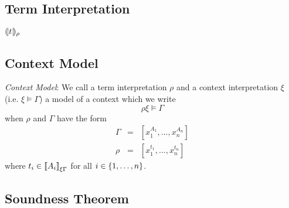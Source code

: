 \subsection{Term Interpretation}

${(\!|t|\!)_{\rho}}$



\subsection{Context Model}

\begin{definition}
    \label{DefinitionContextModel}
    \emph{Context Model}: We call a term interpretation $\rho$ and a context
    interpretation $\xi$ (i.e. $\xi \vDash \Gamma$) a model of a context which
    we write
    $$
        \rho\xi \vDash \Gamma
    $$
    when
    $\rho$ and $\Gamma$ have the form
    $$
    \begin{array}{lll}
        \Gamma &=& [x_1^{A_1}, \ldots, x_n^{A_n}]
        \\
        \rho   &=& [x_1^{t_1}, \ldots, x_n^{t_n}]
    \end{array}
    $$
    where $t_i \in {{[\![}A_i{]\!]}}_{\xi\Gamma}$ for all $i \in {\{1,\ldots,n\}}$.
\end{definition}




\subsection{Soundness Theorem}


